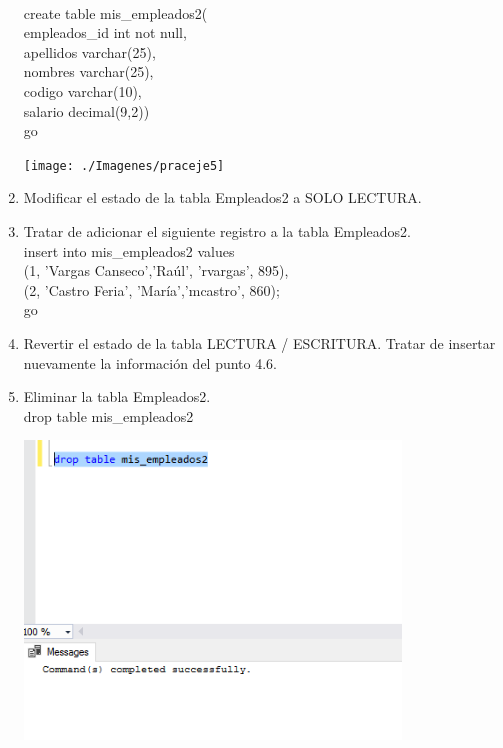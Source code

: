 \begin{enumerate}[1.]
	\\create table mis\_empleados2(
	\\empleados\_id	int not null,
	\\apellidos		varchar(25),
	\\nombres			varchar(25),
	\\codigo			varchar(10),
	\\salario			decimal(9,2))
	\\go
	\begin{center}
	\texttt{[image: ./Imagenes/praceje5]} 
	\end{center}
	\item Modificar el estado de la tabla Empleados2 a SOLO LECTURA.
	\item Tratar de adicionar el siguiente registro a la tabla Empleados2.
	\\insert into mis\_empleados2 values
	\\(1, 'Vargas Canseco','Ra\'ul', 'rvargas', 895),
	\\(2, 'Castro Feria',  'Mar\'ia','mcastro', 860);
	\\go
	\item Revertir el estado de la tabla LECTURA / ESCRITURA. Tratar de insertar nuevamente la información del punto 4.6.
	\item Eliminar la tabla Empleados2.
	\\drop table mis\_empleados2
	\begin{center}
	\includegraphics[width=10cm]{./Imagenes/prac2eje8} 
	\end{center}
	
\end{enumerate}